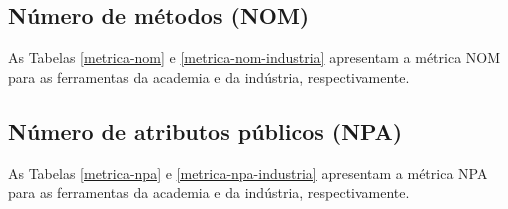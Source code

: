 
\subsection{Número de métodos (NOM)}

As Tabelas \ref{metrica-nom} e \ref{metrica-nom-industria} apresentam a
métrica NOM para as ferramentas da academia e da indústria, respectivamente.



\subsection{Número de atributos públicos (NPA)}

As Tabelas \ref{metrica-npa} e \ref{metrica-npa-industria} apresentam a
métrica NPA para as ferramentas da academia e da indústria, respectivamente.


